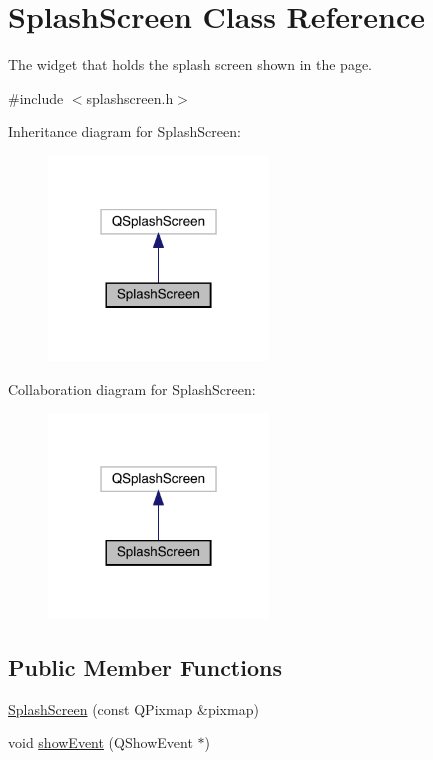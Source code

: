 \hypertarget{classSplashScreen}{}\section{Splash\+Screen Class Reference}
\label{classSplashScreen}


The widget that holds the splash screen shown in the page.  




{\ttfamily \#include $<$splashscreen.\+h$>$}



Inheritance diagram for Splash\+Screen\+:\nopagebreak
\begin{figure}[H]
\begin{center}
\leavevmode
\includegraphics[width=166pt]{classSplashScreen__inherit__graph}
\end{center}
\end{figure}


Collaboration diagram for Splash\+Screen\+:\nopagebreak
\begin{figure}[H]
\begin{center}
\leavevmode
\includegraphics[width=166pt]{classSplashScreen__coll__graph}
\end{center}
\end{figure}
\subsection*{Public Member Functions}
\begin{DoxyCompactItemize}
\item 
\mbox{\hyperlink{classSplashScreen_a25b099ed5f03150091a21ba6fd83fa39}{Splash\+Screen}} (const Q\+Pixmap \&pixmap)
\item 
void \mbox{\hyperlink{classSplashScreen_a1fb8a268c53bc5de2ba37df68cc237cc}{show\+Event}} (Q\+Show\+Event $\ast$)
\end{DoxyCompactItemize}
